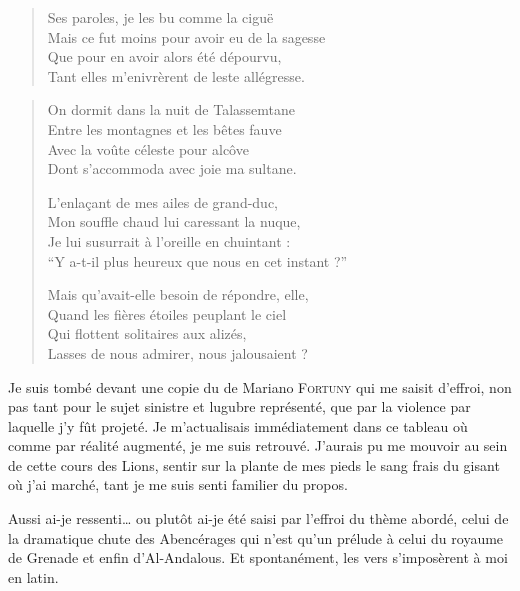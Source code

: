 \begin{verse}%
  \quatrain%
  Ses paroles, je les bu comme la ciguë\\  %
  Mais ce fut moins pour avoir eu de la sagesse\\  %
  Que pour en avoir alors été dépourvu,\\  %
  Tant elles m’enivrèrent de leste allégresse.
\end{verse}


\begin{verse}%
  \quatrain%
  On dormit dans la nuit de Talassemtane\\  %
  Entre les montagnes et les bêtes fauve\\  %
  Avec la voûte céleste pour alcôve\\  %
  Dont s’accommoda avec joie ma sultane.

  L’enlaçant de mes ailes de grand-duc,\\  %
  Mon souffle chaud lui caressant la nuque,\\  %
  Je lui susurrait à l’oreille en chuintant :\\  %
  \enquote{Y a-t-il plus heureux que nous en cet instant ?}

  Mais qu’avait-elle besoin de répondre, elle,\\  %
  Quand les fières étoiles peuplant le ciel\\  %
  Qui flottent solitaires aux alizés,\\  %
  Lasses de nous admirer, nous jalousaient ?
\end{verse}


\begin{prose}
  Je suis tombé devant une copie du  de Mariano \textsc{Fortuny} qui me saisit d’effroi, non pas tant pour le sujet sinistre et lugubre représenté, que par la violence par laquelle j’y fût projeté. Je m’actualisais immédiatement dans ce tableau où comme par réalité augmenté, je me suis retrouvé. J’aurais pu me mouvoir au sein de cette cours des Lions, sentir sur la plante de mes pieds le sang frais du gisant où j’ai marché, tant je me suis senti familier du propos.

  Aussi ai-je ressenti… ou plutôt ai-je été saisi par l’effroi du thème abordé, celui de la dramatique chute des Abencérages qui n’est qu’un prélude à celui du royaume de Grenade et enfin d’Al-Andalous. Et spontanément, les vers s’imposèrent à moi en latin.
\end{prose}

